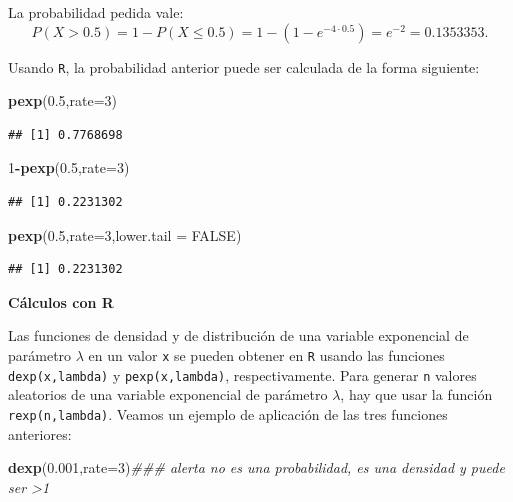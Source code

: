 \documentclass[]{book}
\newenvironment{Shaded}{\begin{snugshade}}{\end{snugshade}}
\newcommand{\CommentTok}[1]{\textcolor[rgb]{0.56,0.35,0.01}{\textit{#1}}}
\newcommand{\DataTypeTok}[1]{\textcolor[rgb]{0.13,0.29,0.53}{#1}}
\newcommand{\DecValTok}[1]{\textcolor[rgb]{0.00,0.00,0.81}{#1}}
\newcommand{\FloatTok}[1]{\textcolor[rgb]{0.00,0.00,0.81}{#1}}
\newcommand{\KeywordTok}[1]{\textcolor[rgb]{0.13,0.29,0.53}{\textbf{#1}}}
\newcommand{\NormalTok}[1]{#1}
\newcommand{\OperatorTok}[1]{\textcolor[rgb]{0.81,0.36,0.00}{\textbf{#1}}}
\newcommand{\OtherTok}[1]{\textcolor[rgb]{0.56,0.35,0.01}{#1}}
\begin{document}
La probabilidad pedida vale:
\[
P(X>0.5)=1-P(X\leq 0.5)=1-(1-e^{-4\cdot 0.5 })=e^{-2}=0.1353353.
\]

Usando \texttt{R}, la probabilidad anterior puede ser calculada de la forma siguiente:

\begin{Shaded}
\begin{Highlighting}[]
\KeywordTok{pexp}\NormalTok{(}\FloatTok{0.5}\NormalTok{,}\DataTypeTok{rate=}\DecValTok{3}\NormalTok{)}
\end{Highlighting}
\end{Shaded}

\begin{verbatim}
## [1] 0.7768698
\end{verbatim}

\begin{Shaded}
\begin{Highlighting}[]
\DecValTok{1}\OperatorTok{-}\KeywordTok{pexp}\NormalTok{(}\FloatTok{0.5}\NormalTok{,}\DataTypeTok{rate=}\DecValTok{3}\NormalTok{)}
\end{Highlighting}
\end{Shaded}

\begin{verbatim}
## [1] 0.2231302
\end{verbatim}

\begin{Shaded}
\begin{Highlighting}[]
\KeywordTok{pexp}\NormalTok{(}\FloatTok{0.5}\NormalTok{,}\DataTypeTok{rate=}\DecValTok{3}\NormalTok{,}\DataTypeTok{lower.tail =} \OtherTok{FALSE}\NormalTok{)}
\end{Highlighting}
\end{Shaded}

\begin{verbatim}
## [1] 0.2231302
\end{verbatim}

\textbf{Cálculos con R}

Las funciones de densidad y de distribución de una variable exponencial de parámetro \(\lambda\) en un valor \texttt{x} se pueden obtener en \texttt{R} usando las funciones \texttt{dexp(x,lambda)} y \texttt{pexp(x,lambda)}, respectivamente. Para generar \texttt{n} valores aleatorios de una variable exponencial de parámetro \(\lambda\), hay que usar la función \texttt{rexp(n,lambda)}. Veamos un ejemplo de aplicación de las tres funciones anteriores:

\begin{Shaded}
\begin{Highlighting}[]
\KeywordTok{dexp}\NormalTok{(}\FloatTok{0.001}\NormalTok{,}\DataTypeTok{rate=}\DecValTok{3}\NormalTok{)}\CommentTok{### alerta no es una probabilidad, es una densidad y puede ser >1}
\end{Highlighting}
\end{Shaded}
\end{document}

